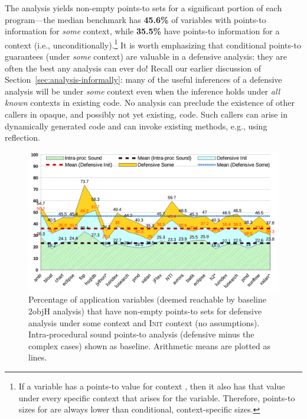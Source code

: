 The analysis yields non-empty points-to sets for a
significant portion of each program---the median benchmark has
\textbf{45.6\%} of variables with points-to information for
\emph{some} context, while \textbf{35.5\%} have points-to information
for a context  (i.e., unconditionally).\footnote{If a variable
has a points-to value for context , then it also has
that value under every specific context that arises for the variable.
Therefore, points-to sizes for  are always lower than
conditional, context-specific sizes.} It is worth
emphasizing that conditional points-to guarantees (under \emph{some}
context) are valuable in a defensive analysis: they are often the best
any analysis can ever do! Recall our earlier discussion of
Section~\ref{sec:analysis-informally}: many of the useful inferences
of a defensive analysis will be under \emph{some} context even when
the inference holds under \emph{all known} contexts in existing code.
No analysis can preclude the existence of other callers in opaque, and
possibly not yet existing, code. Such callers can arise in dynamically
generated code and can invoke existing methods, e.g., using
reflection.

\begin{figure}[tbhp]
  \begin{minipage}[b]{\linewidth}
    \centering
    \includegraphics[width=\linewidth]{assets/defensive/vars.pdf}
  \end{minipage}
  \caption{Percentage of application variables (deemed reachable by
    baseline 2objH analysis) that have non-empty points-to sets for
    defensive analysis under some context and \textsc{Init} context (no
    assumptions). Intra-procedural sound points-to analysis (defensive
    minus the complex cases) shown as baseline. Arithmetic means are
    plotted as lines.}
    \label{fig:coverage}
\end{figure}

